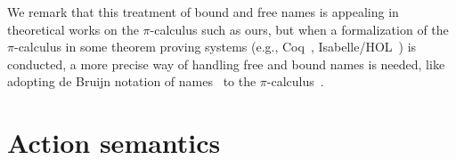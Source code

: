 We remark that this treatment of bound and free names is appealing in theoretical works on the $\pi$-calculus such as ours, but when a formalization of the $\pi$-calculus in some theorem proving systems (e.g., Coq~\cite{DBLP:series/txtcs/BertotC04}, Isabelle/HOL~\cite{DBLP:books/sp/NipkowPW02}) is conducted, a more precise way of handling free and bound names is needed, like adopting de Bruijn notation of names~\cite{DEBRUIJN1972381} to the $\pi$-calculus~\cite{DBLP:conf/tphol/Gay01, DBLP:conf/tphol/Hirschkoff97,  DBLP:journals/mscs/PereraC18}.













\section{Action semantics}\label{sec:Cpi-semantics} 



